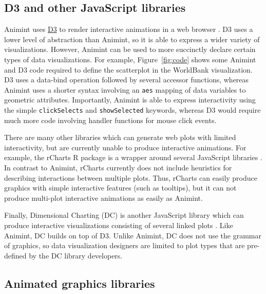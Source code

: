 \documentclass[10pt,journal,compsoc]{IEEEtran}\usepackage[]{graphicx}\usepackage[]{color}
\begin{document}

\subsection{D3 and other JavaScript libraries}

Animint uses \href{http://d3js.org/}{D3} to render interactive
animations in a web browser \citep{d3}. D3 uses a lower level of
abstraction than Animint, so it is able to express a wider variety of
visualizations. However, Animint can be used to more succinctly
declare certain types of data visualizations. For example,
Figure~\ref{fig:code} shows some Animint and D3 code required to
define the scatterplot in the WorldBank visualization. D3 uses a
data-bind operation followed by several accessor functions, whereas
Animint uses a shorter syntax involving an \texttt{aes} mapping
of data variables to geometric attributes. Importantly, Animint is
able to express interactivity using the simple \texttt{clickSelects}
and \texttt{showSelected} keywords, whereas D3 would require much more
code involving handler functions for mouse click events.

There are many other libraries which can generate web plots with
limited interactivity, but are currently unable to produce interactive
animations. For example, the rCharts R package is a wrapper around
several JavaScript libraries \citep{rcharts}. In contrast to Animint,
rCharts currently does not include heuristics for describing interactions between
multiple plots. Thus, rCharts can easily produce graphics with simple interactive
features (such as tooltips), but it can not produce multi-plot
interactive animations as easily as Animint.

Finally, Dimensional Charting (DC) is another JavaScript library which
can produce interactive visualizations consisting of several linked
plots \citep{dc}. Like Animint, DC builds on top of D3. Unlike
Animint, DC does not use the grammar of graphics, so data
visualization designers are limited to plot types that are pre-defined
by the DC library developers.

\subsection{Animated graphics libraries}
\end{document}
